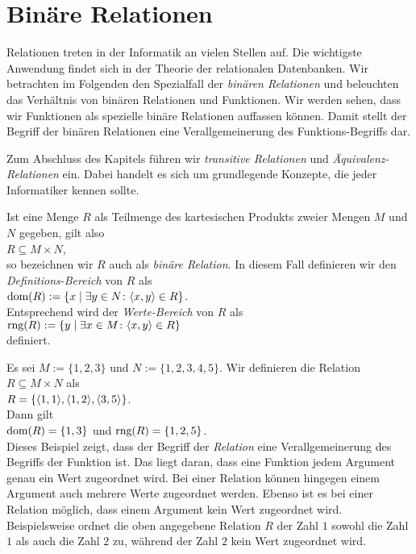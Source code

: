 \section{Bin\"{a}re Relationen}
Relationen treten in der Informatik an vielen Stellen auf.  Die wichtigste
Anwendung findet sich in der Theorie der relationalen Datenbanken.
Wir betrachten im Folgenden den Spezialfall der \emph{bin\"{a}ren Relationen} und beleuchten
das Verh\"{a}ltnis von bin\"{a}ren Relationen und Funktionen. Wir werden sehen, dass wir
Funktionen als spezielle bin\"{a}re Relationen auffassen k\"{o}nnen.  Damit stellt der Begriff der
bin\"{a}ren Relationen eine Verallgemeinerung des Funktions-Begriffs dar.

Zum Abschluss des Kapitels f\"{u}hren wir \emph{transitive Relationen} und
\emph{\"{A}quivalenz-Relationen} ein.  Dabei handelt es sich um grundlegende Konzepte, die jeder Informatiker
kennen sollte.

Ist eine Menge $R$ als Teilmenge des kartesischen Produkts zweier Mengen $M$ und $N$ gegeben, gilt
also \\[0.2cm]
\hspace*{1.3cm} $R \subseteq M \times N$, \\[0.2cm]
so bezeichnen wir $R$ auch als \emph{bin\"{a}re Relation}.  In diesem Fall definieren wir den
\emph{Definitions-Bereich} von $R$ als \\[0.2cm]
\hspace*{1.3cm} $\textrm{dom}(R) := \{ x \mid \exists y \in N \colon \langle x, y \rangle \in R \}$.  
\\[0.2cm]
Entsprechend wird der \emph{Werte-Bereich} von $R$ als \\[0.2cm]
\hspace*{1.3cm} $\textrm{rng}(R) := \{ y \mid \exists x \in M \colon \langle x, y \rangle \in R\}$ \\[0.2cm]
definiert.  

\example
Es sei $M := \{1,2,3\}$ und $N := \{1,2,3,4,5\}$.  Wir definieren die Relation $R \subseteq M \times N$ 
als
\\[0.2cm]
\hspace*{1.3cm}
 $R = \{ \pair(1,1), \pair(1,2), \pair(3,5) \}$.  
\\[0.2cm]
Dann gilt 
\\[0.2cm]
\hspace*{1.3cm} $\textrm{dom}(R) = \{1,3\}$ \quad und \quad $\textrm{rng}(R) = \{1,2,5\}$. 
\\[0.2cm]
Dieses Beispiel zeigt, dass der Begriff der \emph{Relation} eine Verallgemeinerung des Begriffs
der Funktion ist.  Das liegt daran, dass eine Funktion jedem Argument genau ein Wert zugeordnet
wird.  Bei einer Relation k\"{o}nnen hingegen einem Argument auch mehrere Werte zugeordnet werden.
Ebenso ist es bei einer Relation m\"{o}glich, dass einem Argument kein Wert zugeordnet wird.
Beispielsweise ordnet die oben angegebene Relation $R$ der Zahl $1$ sowohl die Zahl $1$ als auch die
Zahl $2$ zu, w\"{a}hrend der Zahl $2$ kein Wert zugeordnet wird.
\eox

